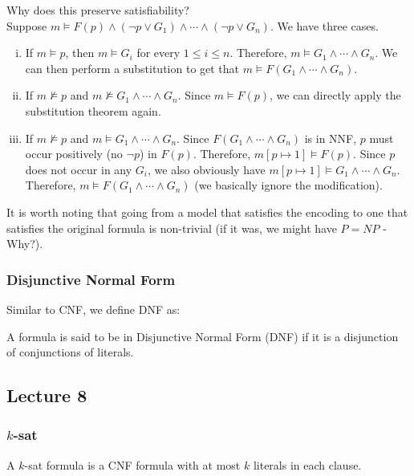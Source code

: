 Why does this preserve satisfiability?\\
Suppose $m\vDash F(p)\land(\neg p\lor G_1)\land\cdots\land(\neg p\lor G_n)$. We have three cases.
\begin{enumerate}[(i)]
	\item If $m\vDash p$, then $m\vDash G_i$ for every $1\leq i\leq n$. Therefore, $m\vDash G_1\land\cdots\land G_n$. We can then perform a substitution to get that $m\vDash F(G_1\land\cdots\land G_n)$.
	\item If $m\nvDash p$ and $m\nvDash G_1\land\cdots\land G_n$. Since $m\vDash F(p)$, we can directly apply the substitution theorem again.
	\item If $m\nvDash p$ and $m\vDash G_1\land\cdots\land G_n$. Since $F(G_1\land\cdots\land G_n)$ is in NNF, $p$ must occur positively (no $\neg p$) in $F(p)$. Therefore, $m[p\mapsto 1]\vDash F(p)$. Since $p$ does not occur in any $G_i$, we also obviously have $m[p\mapsto 1]\vDash G_1\land\cdots\land G_n$. Therefore, $m\vDash F(G_1\land\cdots\land G_n)$ (we basically ignore the modification).
\end{enumerate}

It is worth noting that going from a model that satisfies the encoding to one that satisfies the original formula is non-trivial (if it was, we might have $P=NP$ - Why?).

\subsubsection{Disjunctive Normal Form}

Similar to CNF, we define DNF as:

\begin{definition}
	A formula is said to be in Disjunctive Normal Form (DNF) if it is a disjunction of conjunctions of literals.
\end{definition}

\subsection{Lecture 8}

\subsubsection{\texorpdfstring{$k$}{k}-sat}

\begin{definition}
	A $k$-sat formula is a CNF formula with at most $k$ literals in each clause.
\end{definition}

